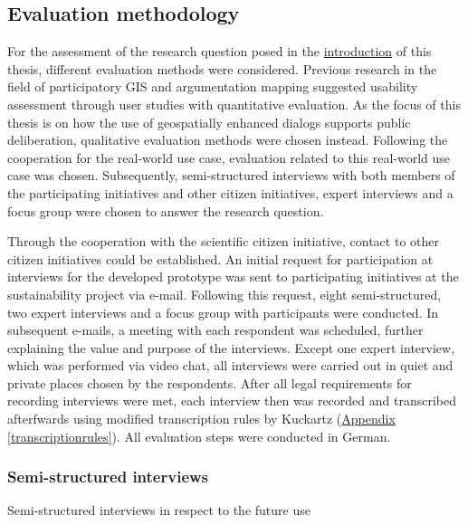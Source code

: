 \subsection{Evaluation methodology}
\label{subchap:ev_methodology}
For the assessment of the research question posed in the \hyperref[chap:introduction]{introduction} of this thesis, different evaluation methods were considered. Previous research in the field of participatory GIS and argumentation mapping suggested usability assessment through user studies with quantitative evaluation. As the focus of this thesis is on how the use of geospatially enhanced dialogs supports public deliberation, qualitative evaluation methods were chosen instead. Following the cooperation for the real-world use case, evaluation related to this real-world use case was chosen. Subsequently, semi-structured interviews with both members of the participating initiatives and other citizen initiatives, expert interviews and a focus group were chosen to answer the research question. 


Through the cooperation with the scientific citizen initiative, contact to other citizen initiatives could be established. An initial request for participation at interviews for the developed prototype was sent to participating initiatives at the sustainability project via e-mail. Following this request, eight semi-structured, two expert interviews and a focus group with  participants were conducted. In subsequent e-mails, a meeting with each respondent was scheduled, further explaining the value and purpose of the interviews. Except one expert interview, which was performed via video chat, all interviews were carried out in quiet and private places chosen by the respondents. After all legal requirements for recording interviews were met, each interview then was recorded and transcribed afterfwards using modified transcription rules by Kuckartz \cite{kuckartz2007} (\hyperref[transcriptionrules]{Appendix \ref{transcriptionrules}}). All evaluation steps were conducted in German.



\subsubsection{Semi-structured interviews}

Semi-structured interviews in respect to the future use

